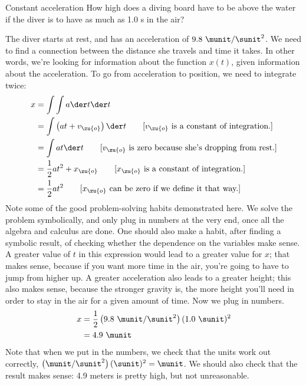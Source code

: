 \begin{eg}{Constant acceleration}\label{eg:diving-board}
\egquestion
How high does a diving board have to be above the water if the diver is to have as much as 1.0 s
in the air?

\eganswer
The diver starts at rest, and has an acceleration of $9.8\ \munit/\sunit^2$. 
We need to find a connection between the distance she travels and time it takes. In other words,
we're looking for information about the function $x(t)$, given information about the acceleration.
To go from acceleration to position, we need to integrate twice:
\begin{align*}
  x &= \int \int a \der t \der t \\
    &= \int \left(at+v_\zu{o}\right) \der t \qquad \text{[$v_\zu{o}$ is a constant of integration.]} \\
    &= \int at \der t \qquad \text{[$v_\zu{o}$ is zero because she's dropping from rest.]} \\
    &= \frac{1}{2}at^2+x_\zu{o} \qquad \text{[$x_\zu{o}$ is a constant of integration.]} \\
    &= \frac{1}{2}at^2 \qquad \text{[$x_\zu{o}$ can be zero if we define it that way.]}
\end{align*}
Note some of the good problem-solving habits demonstrated here. We solve the problem symbolically, and only
plug in numbers at the very end, once all the algebra and calculus are done. One should also make
a habit, after finding a symbolic result, of checking whether the dependence on the variables
make sense. A greater value of $t$ in this expression would lead to a greater value for $x$; that makes
sense, because if you want more time in the air, you're going to have to jump from higher up. A greater
acceleration also leads to a greater height; this also makes sense, because the stronger gravity is,
the more height you'll need in order to stay in the air for a given amount of time.
Now we plug in numbers.
\begin{align*}
  x  &= \frac{1}{2}\left(9.8\ \munit/\sunit^2\right)(1.0\ \sunit)^2  \\
    &= 4.9\ \munit
\end{align*}
Note that when we put in the numbers,
we check that the units work out correctly, $\left(\munit/\sunit^2\right)(\sunit)^2=\munit$. We should
also check that the result makes sense: 4.9 meters is pretty high, but not unreasonable.
\end{eg}

